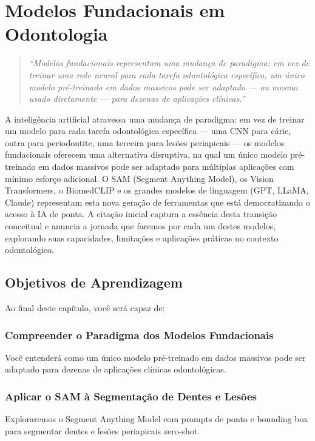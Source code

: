 \chapter{Modelos Fundacionais em Odontologia}
\label{cap:modelos-fundacionais}
\nivelcinco

\begin{quote}
\textit{``Modelos fundacionais representam uma mudança de paradigma: em vez de treinar uma rede neural para cada tarefa odontológica específica, um único modelo pré-treinado em dados massivos pode ser adaptado --- ou mesmo usado diretamente --- para dezenas de aplicações clínicas.''}
\end{quote}

A inteligência artificial atravessa uma mudança de paradigma: em vez de treinar um modelo para cada tarefa odontológica específica --- uma CNN para cárie, outra para periodontite, uma terceira para lesões periapicais --- os modelos fundacionais oferecem uma alternativa disruptiva, na qual um único modelo pré-treinado em dados massivos pode ser adaptado para múltiplas aplicações com mínimo esforço adicional. O SAM (Segment Anything Model), os Vision Transformers, o BiomedCLIP e os grandes modelos de linguagem (GPT, LLaMA, Claude) representam esta nova geração de ferramentas que está democratizando o acesso à IA de ponta. A citação inicial captura a essência desta transição conceitual e anuncia a jornada que faremos por cada um destes modelos, explorando suas capacidades, limitações e aplicações práticas no contexto odontológico.

\section{Objetivos de Aprendizagem}

Ao final deste capítulo, você será capaz de:

\subsection{Compreender o Paradigma dos Modelos Fundacionais}
Você entenderá como um único modelo pré-treinado em dados massivos pode ser adaptado para dezenas de aplicações clínicas odontológicas.

\subsection{Aplicar o SAM à Segmentação de Dentes e Lesões}
Exploraremos o Segment Anything Model com prompts de ponto e bounding box para segmentar dentes e lesões periapicais zero-shot.

